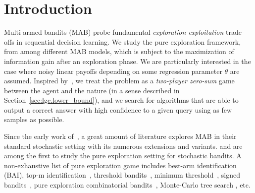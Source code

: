 \section{Introduction}\label{sec:lgc.intro}

Multi-armed bandits (MAB) probe fundamental \emph{exploration-exploitation} trade-offs in sequential decision learning. We study the pure exploration framework, from among different MAB models, which is subject to the maximization of information gain after an exploration phase. We are particularly interested in the case where noisy linear payoffs depending on some regression parameter $\theta$ are assumed. Inspired by~\citet{degenne2019game}, we treat the problem as a \emph{two-player zero-sum} game between the agent and the nature (in a sense described in Section~\ref{sec:lgc.lower_bound}), and we search for algorithms that are able to output a correct answer with high confidence to a given query using as few samples as possible.

Since the early work of~\citet{robbins1952}, a great amount of literature explores MAB in their standard stochastic setting with its numerous extensions and variants. \citet{even-dar2002pac} and \citet{bubeck2009pure} are among the first to study the pure exploration setting for stochastic bandits. A non-exhaustive list of pure exploration game includes best-arm identification (BAI), top-m identification~\cite{kalyanakrishnan2010}, threshold bandits~\cite{locatelli2016thresholding}, minimum threshold~\cite{kaufmann2018murphy}, signed bandits~\cite{menard2019lma}, pure exploration combinatorial bandits~\cite{chen2014combinatorial}, Monte-Carlo tree search \cite{teraoka2014mc}, etc.

